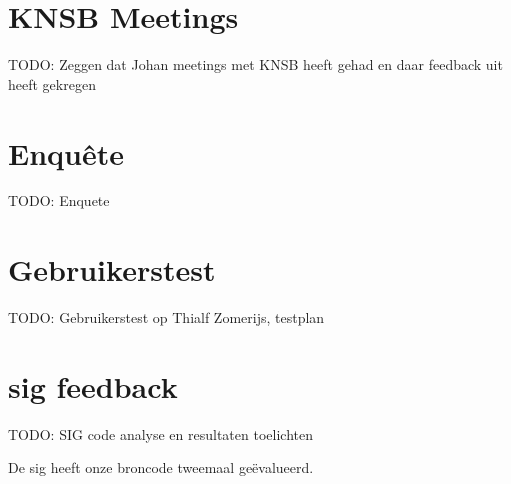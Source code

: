 \section{KNSB Meetings}

{\par \bigskip \par \color{red} TODO: Zeggen dat Johan meetings met KNSB heeft gehad en daar feedback uit heeft gekregen \par \bigskip \par }

\section{Enquête}

{\par \bigskip \par \color{red} TODO: Enquete \par \bigskip \par }

\section{Gebruikerstest}

{\par \bigskip \par \color{red} TODO: Gebruikerstest op Thialf Zomerijs, testplan \par \bigskip \par }

\section{\acs{sig} feedback}

{\par \bigskip \par \color{red} TODO: SIG code analyse en resultaten toelichten \par \bigskip \par }

De \acf{sig} heeft onze broncode tweemaal geëvalueerd.